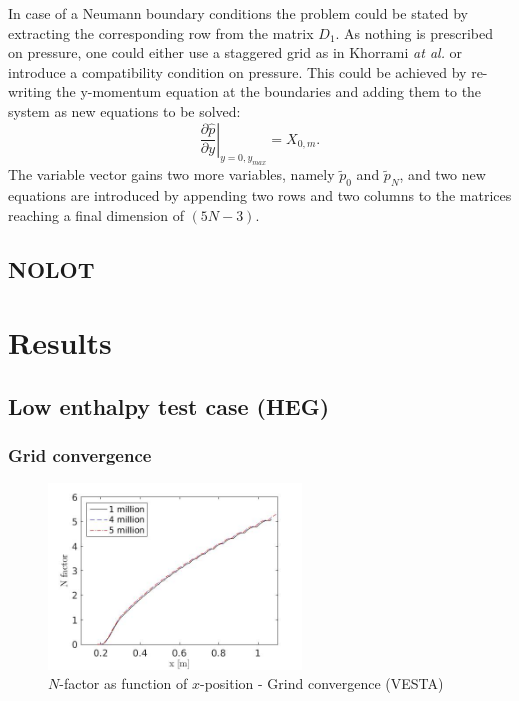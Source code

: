 \documentclass[]{aiaa-tc}%
\begin{document}
{In case of a Neumann boundary conditions the problem could be stated by extracting the corresponding row from the matrix $D_1$.
As nothing is prescribed on pressure, one could either use a staggered grid as in Khorrami \emph{at al.}\cite{Khorrami_Malik_Ash:1989} or introduce a compatibility condition on pressure. This could be achieved by re-writing the y-momentum equation at the boundaries and adding them to the system as new equations to be solved:
\begin{equation}
\left.\frac{\partial \hat{p}}{\partial y} \right|_{y=0,y_{max}}= X_{0,m}.
\end{equation}
The variable vector gains two more variables, namely $\tilde{p}_0$ and $\tilde{p}_N$, and two new equations are introduced by appending two rows and two columns to the matrices reaching a final dimension of $\left( 5N -3 \right)$.
}

\subsection{NOLOT}


\section{Results}\label{sect:results}

\subsection{Low enthalpy test case (HEG)}\label{sect:low_enthalpy}
\subsubsection{Grid convergence}\label{sect:grid}
\begin{figure}[htbp]
	\centering
\includegraphics[width=0.6\textwidth]{pics/N_comparison_grid.jpg}
	\caption{$N$-factor as function of $x$-position - Grind convergence (VESTA)}
	\label{fig:N_x_grids}
\end{figure}
\end{document}
